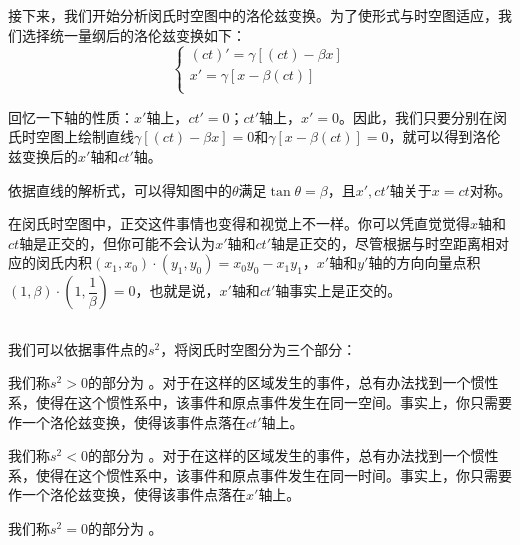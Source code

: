 接下来，我们开始分析闵氏时空图中的洛伦兹变换。为了使形式与时空图适应，我们选择统一量纲后的洛伦兹变换如下：
\[\left\{\begin{array}{l}
        (ct)'=\gamma[(ct)-\beta x] \\
        x'=\gamma[x-\beta(ct)]     \\
    \end{array}\right.\]

回忆一下轴的性质：$x'$轴上，$ct'=0$；$ct'$轴上，$x'=0$。因此，我们只要分别在闵氏时空图上绘制直线$\gamma[(ct)-\beta x]=0$和$ \gamma[x-\beta(ct)]=0$，就可以得到洛伦兹变换后的$x'$轴和$ct'$轴。

依据直线的解析式，可以得知图中的$\theta$满足$\tan\theta = \beta$，且$x',ct'$轴关于$x=ct$对称。

在闵氏时空图中，正交这件事情也变得和视觉上不一样。你可以凭直觉觉得$x$轴和$ct$轴是正交的，但你可能不会认为$x'$轴和$ct'$轴是正交的，尽管根据与时空距离相对应的闵氏内积$(x_1,x_0)\cdot(y_1,y_0)=x_0y_0-x_1y_1$，$x'$轴和$y'$轴的方向向量点积$(1,\beta)\cdot(1,\dfrac{1}{\beta})=0$，也就是说，$x'$轴和$ct'$轴事实上是正交的。

\subsection[时序和因果关系]{}
我们可以依据事件点的$s^2$，将闵氏时空图分为三个部分：
\begin{Itemize}
    \item {} 我们称$s^2>0$的部分为 。对于在这样的区域发生的事件，总有办法找到一个惯性系，使得在这个惯性系中，该事件和原点事件发生在同一空间。事实上，你只需要作一个洛伦兹变换，使得该事件点落在$ct'$轴上。
    \item  {} 我们称$s^2<0$的部分为 。对于在这样的区域发生的事件，总有办法找到一个惯性系，使得在这个惯性系中，该事件和原点事件发生在同一时间。事实上，你只需要作一个洛伦兹变换，使得该事件点落在$x'$轴上。
    \item {} 我们称$s^2=0$的部分为 。
\end{Itemize}

